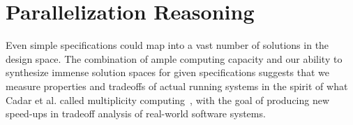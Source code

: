 \documentclass{sig-alternate}
\begin{document}
 


\section{Parallelization Reasoning} %
\label{parallelization}

Even simple specifications could map into a vast number of solutions in the design space. The combination of ample computing capacity and our ability to synthesize immense solution spaces for given specifications suggests that we measure properties and tradeoffs of actual running systems in the spirit of what Cadar et al. called multiplicity computing~\cite{cadar_multiplicity_2010}, with the goal of producing new speed-ups in tradeoff analysis of real-world software systems.


\end{document}
